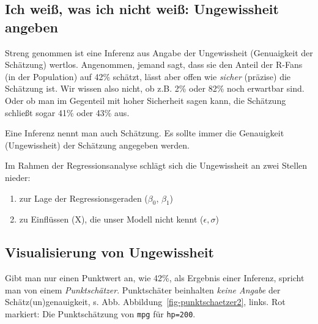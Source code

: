 \documentclass[
  a4paper,
  DIV=11]{scrreprt}
\providecommand{\tightlist}{%
  \setlength{\itemsep}{0pt}\setlength{\parskip}{0pt}}\usepackage{longtable,booktabs,array}
\theoremstyle{definition}
\theoremstyle{remark}
\begin{document}
\hypertarget{ich-weiuxdf-was-ich-nicht-weiuxdf-ungewissheit-angeben}{%
\subsection{Ich weiß, was ich nicht weiß: Ungewissheit
angeben}\label{ich-weiuxdf-was-ich-nicht-weiuxdf-ungewissheit-angeben}}

Streng genommen ist eine Inferenz aus Angabe der Ungewissheit
(Genuaigkeit der Schätzung) wertlos. Angenommen, jemand sagt, dass sie
den Anteil der R-Fans (in der Population) auf 42\% schätzt, lässt aber
offen wie \emph{sicher} (präzise) die Schätzung ist. Wir wissen also
nicht, ob z.B. 2\% oder 82\% noch erwartbar sind. Oder ob man im
Gegenteil mit hoher Sicherheit sagen kann, die Schätzung schließt sogar
41\% oder 43\% aus.

\begin{tcolorbox}[enhanced jigsaw, left=2mm, colframe=quarto-callout-important-color-frame, opacityback=0, arc=.35mm, rightrule=.15mm, breakable, toptitle=1mm, colbacktitle=quarto-callout-important-color!10!white, colback=white, coltitle=black, bottomrule=.15mm, titlerule=0mm, opacitybacktitle=0.6, bottomtitle=1mm, title=\textcolor{quarto-callout-important-color}{\faExclamation}\hspace{0.5em}{Wichtig}, toprule=.15mm, leftrule=.75mm]
Eine Inferenz nennt man auch Schätzung. Es sollte immer die Genauigkeit
(Ungewissheit) der Schätzung angegeben werden.
\end{tcolorbox}

Im Rahmen der Regressionsanalyse schlägt sich die Ungewissheit an zwei
Stellen nieder:

\begin{enumerate}
\def\labelenumi{\arabic{enumi}.}
\tightlist
\item
  zur Lage der Regressionsgeraden (\(\beta_0\), \(\beta_1\))
\item
  zu Einflüssen (X), die unser Modell nicht kennt (\(\epsilon, \sigma\))
\end{enumerate}

\hypertarget{visualisierung-von-ungewissheit}{%
\subsection{Visualisierung von
Ungewissheit}\label{visualisierung-von-ungewissheit}}

Gibt man nur einen Punktwert an, wie 42\%, als Ergebnis einer Inferenz,
spricht man von einem \emph{Punktschätzer}. Punktschäter beinhalten
\emph{keine Angabe} der Schätz(un)genauigkeit, s. Abb.
Abbildung~\ref{fig-punktschaetzer2}, links. Rot markiert: Die
Punktschätzung von \texttt{mpg} für \texttt{hp=200}.
\end{document}
